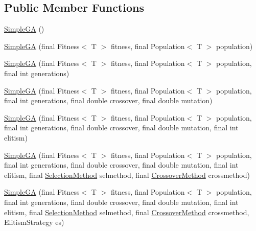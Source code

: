 \subsection*{Public Member Functions}
\begin{CompactItemize}
\item 
\hyperlink{classjenes_1_1algorithms_1_1_simple_g_a_3_01_t_01extends_01_chromosome_01_4_706a621e21564095963264fdfd2eba32}{SimpleGA} ()
\item 
\hyperlink{classjenes_1_1algorithms_1_1_simple_g_a_3_01_t_01extends_01_chromosome_01_4_44ee069daad5aaed809b2d83303052e0}{SimpleGA} (final Fitness$<$ T $>$ fitness, final Population$<$ T $>$ population)
\item 
\hyperlink{classjenes_1_1algorithms_1_1_simple_g_a_3_01_t_01extends_01_chromosome_01_4_cbdaae378fd9263001e6393cb132bda4}{SimpleGA} (final Fitness$<$ T $>$ fitness, final Population$<$ T $>$ population, final int generations)
\item 
\hyperlink{classjenes_1_1algorithms_1_1_simple_g_a_3_01_t_01extends_01_chromosome_01_4_9382ccbfaed16b3dbf4feeb23afa71e8}{SimpleGA} (final Fitness$<$ T $>$ fitness, final Population$<$ T $>$ population, final int generations, final double crossover, final double mutation)
\item 
\hyperlink{classjenes_1_1algorithms_1_1_simple_g_a_3_01_t_01extends_01_chromosome_01_4_e4d2d54f7d376688e0ab0eabfa85a7e2}{SimpleGA} (final Fitness$<$ T $>$ fitness, final Population$<$ T $>$ population, final int generations, final double crossover, final double mutation, final int elitism)
\item 
\hyperlink{classjenes_1_1algorithms_1_1_simple_g_a_3_01_t_01extends_01_chromosome_01_4_eb160f73fc3a8937c7d8da9140f57e38}{SimpleGA} (final Fitness$<$ T $>$ fitness, final Population$<$ T $>$ population, final int generations, final double crossover, final double mutation, final int elitism, final \hyperlink{classjenes_1_1algorithms_1_1_simple_g_a_3_01_t_01extends_01_chromosome_01_4_6310e8ba52593a9b9ab7809caa9ba296}{SelectionMethod} selmethod, final \hyperlink{classjenes_1_1algorithms_1_1_simple_g_a_3_01_t_01extends_01_chromosome_01_4_d015c6a036c7234fe34a1a78fc3c55bf}{CrossoverMethod} crossmethod)
\item 
\hyperlink{classjenes_1_1algorithms_1_1_simple_g_a_3_01_t_01extends_01_chromosome_01_4_da2d647b3a202f4e6bb7d1b1c894791b}{SimpleGA} (final Fitness$<$ T $>$ fitness, final Population$<$ T $>$ population, final int generations, final double crossover, final double mutation, final int elitism, final \hyperlink{classjenes_1_1algorithms_1_1_simple_g_a_3_01_t_01extends_01_chromosome_01_4_6310e8ba52593a9b9ab7809caa9ba296}{SelectionMethod} selmethod, final \hyperlink{classjenes_1_1algorithms_1_1_simple_g_a_3_01_t_01extends_01_chromosome_01_4_d015c6a036c7234fe34a1a78fc3c55bf}{CrossoverMethod} crossmethod, ElitismStrategy es)

\end{CompactItemize}
